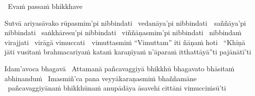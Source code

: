 \begin{pali-leader}
  \anglebracketleft\ \hspace{-0.5mm}Evaṁ passaṁ bhikkhave \hspace{-0.5mm}\anglebracketright\
\end{pali-leader}
\begin{pali-hangtogether}
  Sutvā ariyasāvako rūpasmim'pi nibbindati \breathmark\ vedanāya'pi \mbox{nibbindati}~\breathmark\ saññāya'pi nibbindati \breathmark\ saṅkhāresu'pi nibbindati \breathmark\ viññāṇasmim'pi nibbindati \breathmark\ nibbindaṁ virajjati \breathmark\ virāgā \mbox{vimuccati}~\breathmark\ vimuttasmiṁ ``Vimuttam'' iti ñāṇaṁ hoti \breathmark\ ``Khīṇā jāti vusitaṁ brahmacariyaṁ kataṁ karaṇīyaṁ n'āparaṁ itthattāyā''ti pajānātī'ti
\end{pali-hangtogether}

\clearpage

\begin{pali-hang}
  Idam'avoca bhagavā \breathmark\ Attamanā pañcavaggiyā bhikkhū bhagavato bhāsitaṁ abhinanduṁ \breathmark\ Imasmiñ'ca pana veyyākaraṇasmiṁ bhaññamāne \breathmark\ pañcavaggiyānaṁ bhikkhūnaṁ anupādāya āsavehi cittāni vimucciṁsū'ti
\end{pali-hang}

\suttaRef{[SN 22.59]}

